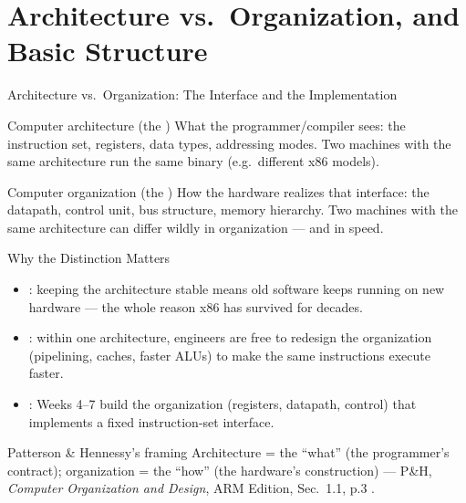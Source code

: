 \documentclass[aspectratio=169]{beamer}
\begin{document}

\section{Architecture vs.\ Organization, and Basic Structure}

\begin{frame}{Architecture vs.\ Organization: The Interface and the Implementation}
  \begin{block}{Computer architecture (the )}
    What the programmer/compiler sees: the instruction set, registers, data
    types, addressing modes. Two machines with the same architecture run the
    same binary (e.g.\ different x86 models).
  \end{block}
  \begin{block}{Computer organization (the )}
    How the hardware realizes that interface: the datapath, control unit,
    bus structure, memory hierarchy. Two machines with the same architecture
    can differ wildly in organization --- and in speed.
  \end{block}
  \vspace{0.2cm}
\end{frame}

\begin{frame}{Why the Distinction Matters}
  \begin{itemize}
    \item {}: keeping the architecture stable means old
      software keeps running on new hardware --- the whole reason x86 has
      survived for decades.
    \item {}: within one architecture, engineers are free to
      redesign the organization (pipelining, caches, faster ALUs) to make the
      same instructions execute faster.
    \item {}: Weeks 4--7 build the organization (registers,
      datapath, control) that implements a fixed instruction-set interface.
  \end{itemize}
  \vspace{0.2cm}
  \begin{exampleblock}{Patterson \& Hennessy's framing}
    Architecture = the ``what'' (the programmer's contract); organization =
    the ``how'' (the hardware's construction) --- P\&H, \textit{Computer
    Organization and Design}, ARM Edition, Sec.~1.1, p.3
    \cite{PattersonHennessy2017_computer_organization_design}.
  \end{exampleblock}
\end{frame}
\end{document}
